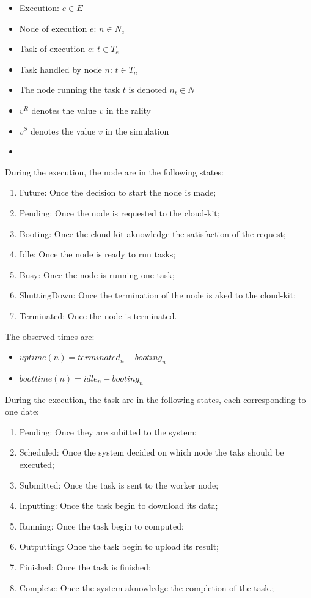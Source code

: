 \documentclass[a4paper,10pt]{article}
\begin{document}
\begin{itemize}
 \item Execution: $e \in E$
 \item Node of execution $e$: $n \in N_e$
 \item Task of execution $e$: $t \in T_e$
 \item Task handled by node $n$: $t \in T_n$
 \item The node running the task $t$ is denoted $n_t \in N$
 \item $v^R$ denotes the value $v$ in the rality
 \item $v^S$ denotes the value $v$ in the simulation
 \item 
\end{itemize}

During the execution, the node are in the following states:
\begin{enumerate}
 \item Future: Once the decision to start the node is made;
 \item Pending: Once the node is requested to the cloud-kit;
 \item Booting: Once the cloud-kit aknowledge the satisfaction of the request;
 \item Idle: Once the node is ready to run tasks;
 \item Busy: Once the node is running one task;
 \item ShuttingDown: Once the termination of the node is aked to the cloud-kit;
 \item Terminated: Once the node is terminated.
\end{enumerate}

The observed times are:
\begin{itemize}
 \item $uptime(n) = terminated_n - booting_n$ 
 \item $boottime(n) = idle_n - booting_n$ 
\end{itemize}


During the execution, the task are in the following states, each corresponding to one date:
\begin{enumerate}
 \item Pending: Once they are subitted to the system;
 \item Scheduled: Once the system decided on which node the taks should be executed;
 \item Submitted: Once the task is sent to the worker node;
 \item Inputting: Once the task begin to download its data;
 \item Running: Once the task begin to computed;
 \item Outputting: Once the task begin to upload its result;
 \item Finished: Once the task is finished;
 \item Complete: Once the system aknowledge the completion of the task.;
\end{enumerate}
\end{document}
